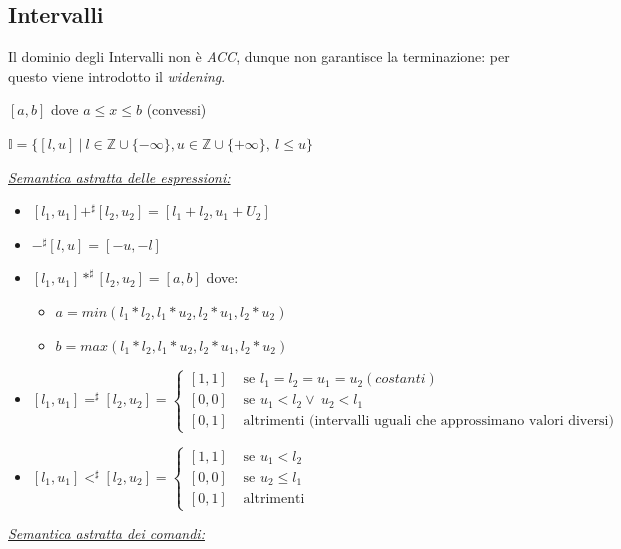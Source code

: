 \documentclass[a4paper, 10pt]{book}
\begin{document}
\newpage
\subsection{Intervalli}
Il dominio degli Intervalli non è \textit{ACC}, dunque non garantisce la terminazione: per questo viene introdotto il \textit{widening}.

\begin{center}
	$[a, b]$ dove $a\leq x\leq b$ (convessi)
	
	$\mathbb{I} = \{[l, u] ~|~ l\in \mathbb{Z}\cup \{-\infty\}, u\in\mathbb{Z}\cup \{+\infty\}, ~l\leq u\}$
\end{center}

\noindent
\textit{\underline{Semantica astratta delle espressioni:}}
\begin{itemize}
	\item $[l_1, u_1] +^\sharp [l_2, u_2] = [l_1 + l_2, u_1 + U_2]$
	\item $-^\sharp[l, u] = [-u, -l]$
	\item $[l_1, u_1] *^\sharp [l_2, u_2] = [a, b]$ dove:
	\begin{itemize}
		\item $a=min(l_1*l_2, l_1*u_2, l_2*u_1, l_2*u_2)$
		\item $b=max(l_1*l_2, l_1*u_2, l_2*u_1, l_2*u_2)$
	\end{itemize}
	\item $[l_1, u_1] =^\sharp [l_2, u_2] =
	\begin{cases}
	[1, 1] &\text{ se } l_1=l_2=u_1=u_2 (costanti) \\
	[0, 0] &\text{ se } u_1 < l_2 \lor ~u_2 < l_1\\
	[0, 1] &\text{ altrimenti (intervalli uguali che approssimano valori diversi) }
	\end{cases}$
	\item $[l_1, u_1] <^\sharp [l_2, u_2] =
	\begin{cases}
	[1, 1] &\text{ se } u_1<l_2 \\
	[0, 0] &\text{ se } u_2 \leq l_1 \\
	[0, 1] &\text{ altrimenti }
	\end{cases}$
\end{itemize}

\underline{\textit{Semantica astratta dei comandi:}}
\end{document}
